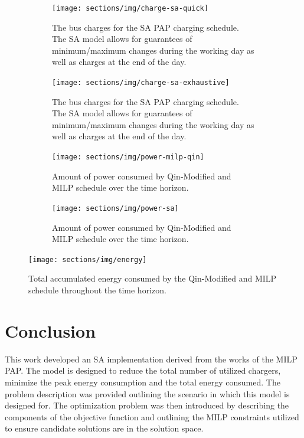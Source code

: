 \documentclass[11pt,a4paper,final]{article}
\begin{document}
\begin{figure}\ContinuedFloat
  \begin{subfigure}[t]{\textwidth}
    \centering
    \texttt{[image: sections/img/charge-sa-quick]}
    \caption{The bus charges for the SA PAP charging schedule. The SA model allows for guarantees of minimum/maximum changes during the working day as well as charges at the end of the day.}
    \label{subfig:sa-quick-charge}
  \end{subfigure}
  \hfill
  \begin{subfigure}[t]{\textwidth}
    \centering
    \texttt{[image: sections/img/charge-sa-exhaustive]}
    \caption{The bus charges for the SA PAP charging schedule. The SA model allows for guarantees of minimum/maximum changes during the working day as well as charges at the end of the day.}
    \label{subfig:sa-exhaustive-charge}
  \end{subfigure}
  \caption{}
  \label{fig:charge}
\end{figure}

\begin{figure}
  \begin{subfigure}[t]{\textwidth}
    \centering
    \texttt{[image: sections/img/power-milp-qin]}
    \caption{Amount of power consumed by Qin-Modified and MILP schedule over the time horizon.}
    \label{fig:power-usage-milp-qin}
  \end{subfigure}

  \hfill

  \begin{subfigure}[t]{\textwidth}
    \centering
    \texttt{[image: sections/img/power-sa]}
    \caption{Amount of power consumed by Qin-Modified and MILP schedule over the time horizon.}
    \label{fig:power-usage-sa}
  \end{subfigure}
  \caption{}
  \label{fig:power}
\end{figure}

\begin{figure}[htpb]
\centering \texttt{[image: sections/img/energy]}
    \caption{Total accumulated energy consumed by the Qin-Modified and MILP schedule throughout the time horizon.}
    \label{fig:energy-usage}
\end{figure}


\section{Conclusion}
\label{sec:conclusion}
This work developed an SA implementation derived from the works of the MILP PAP. The model is designed to reduce the
total number of utilized chargers, minimize the peak energy consumption and the total energy consumed. The problem
description was provided outlining the scenario in which this model is designed for. The optimization problem was then
introduced by describing the components of the objective function and outlining the MILP constraints utilized to ensure
candidate solutions are in the solution space.
\end{document}

